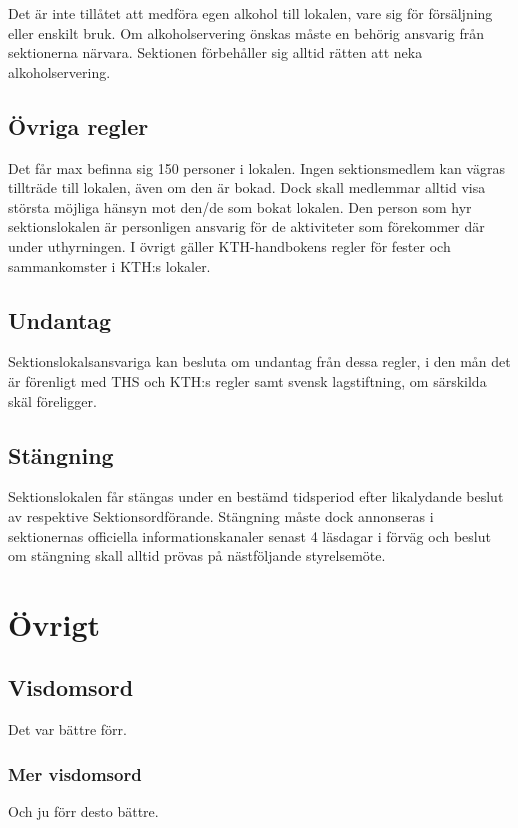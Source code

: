 \documentclass[a4paper,12pt]{article}
\begin{document}
Det är inte tillåtet att medföra egen alkohol till lokalen, vare sig för försäljning eller enskilt bruk. Om alkoholservering önskas måste en behörig ansvarig från sektionerna närvara. Sektionen förbehåller sig alltid rätten att neka alkoholservering.

\subsection{Övriga regler}

Det får max befinna sig 150 personer i lokalen. Ingen sektionsmedlem kan
vägras tillträde till lokalen, även om den är bokad. Dock skall medlemmar alltid visa största möjliga hänsyn mot den/de som bokat lokalen. Den person som hyr sektionslokalen är personligen ansvarig för de aktiviteter som förekommer där under uthyrningen. I övrigt gäller KTH-handbokens regler för
fester och sammankomster i KTH:s lokaler.

\subsection{Undantag}

Sektionslokalsansvariga kan besluta om undantag från dessa regler, i den mån det är förenligt med THS och KTH:s regler samt svensk lagstiftning, om särskilda skäl föreligger.

\subsection{Stängning}

Sektionslokalen får stängas under en bestämd tidsperiod efter likalydande beslut av respektive Sektionsordförande. Stängning måste dock annonseras i sektionernas officiella informationskanaler senast 4 läsdagar i förväg och beslut om stängning skall alltid prövas på nästföljande styrelsemöte.

\section{Övrigt}

\subsection{Visdomsord}

Det var bättre förr.

\subsubsection{Mer visdomsord}

Och ju förr desto bättre.
\end{document}
